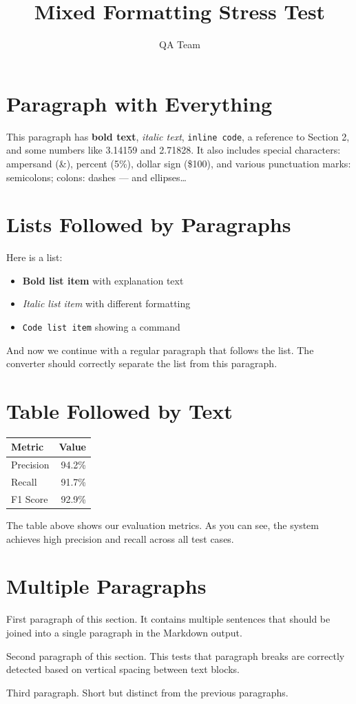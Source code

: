\documentclass[12pt]{article}
\title{Mixed Formatting Stress Test}
\author{QA Team}
\begin{document}
\maketitle

\section{Paragraph with Everything}
This paragraph has \textbf{bold text}, \textit{italic text}, \texttt{inline code},
a reference to Section 2, and some numbers like 3.14159 and 2.71828. It also
includes special characters: ampersand (\&), percent (5\%), dollar sign (\$100),
and various punctuation marks: semicolons; colons: dashes --- and ellipses\ldots

\section{Lists Followed by Paragraphs}
Here is a list:
\begin{itemize}
    \item \textbf{Bold list item} with explanation text
    \item \textit{Italic list item} with different formatting
    \item \texttt{Code list item} showing a command
\end{itemize}
And now we continue with a regular paragraph that follows the list. The converter
should correctly separate the list from this paragraph.

\section{Table Followed by Text}
\begin{table}[h]
\centering
\begin{tabular}{|l|r|}
\hline
\textbf{Metric} & \textbf{Value} \\
\hline
Precision & 94.2\% \\
Recall & 91.7\% \\
F1 Score & 92.9\% \\
\hline
\end{tabular}
\end{table}
The table above shows our evaluation metrics. As you can see, the system achieves
high precision and recall across all test cases.

\section{Multiple Paragraphs}
First paragraph of this section. It contains multiple sentences that should be
joined into a single paragraph in the Markdown output.

Second paragraph of this section. This tests that paragraph breaks are correctly
detected based on vertical spacing between text blocks.

Third paragraph. Short but distinct from the previous paragraphs.
\end{document}
